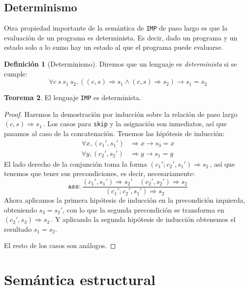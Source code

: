 \documentclass[
  a4paper, 
  10pt, 
  parskip=half, 
  toc=bibliography,
]{scrbook}
\theoremstyle{definition}
\theoremstyle{bolddef}
\newtheorem{theorem}{Teorema}[section]
\newtheorem{definition}[theorem]{Definición}
\newcommand{\funfont}[1]{\texttt{#1}}
\renewcommand{\implies}{\rightarrow}
\newcommand{\ImpConcat}[2]{{#1} \texttt{;} \ {#2}}
\newcommand{\ImpSkip}{\texttt{skip}}
\newcommand{\ImpName}{\texttt{IMP}}
\newcommand{\bigstep}{\Longrightarrow}
\begin{document}
\subsection{Determinismo}

Otra propiedad importante de la semántica de \ImpName{} de paso largo
es que la evaluación de un programa es determinista. Es decir, dado un
programa y un estado solo a lo sumo hay un estado al que el programa puede evaluarse.

\begin{definition}[Determinismo]\label{thm:deterministic}
  Diremos que un lenguaje es \emph{determinista} si se cumple:
  \[
  \forall c \ s \ s_1 \ s_2, ((c, s) \bigstep s_1 \land (c, s) \bigstep s_2) \implies s_1 = s_2
  \]
\end{definition}

\begin{theorem}
  El lenguaje \ImpName{} es determinista.
\end{theorem}

\begin{proof}
  Haremos la demostración por inducción sobre la relación de paso largo
  \((c, s) \bigstep s_1\, \). Los casos para \ImpSkip{} y la asignación son
  inmediatos, así que pasamos al caso de la concatenación. Tenemos 
  las hipótesis de inducción:
  \begin{align*}
    \forall x, (c_1', s_1') &\bigstep x \implies s_3 = x \\
    \forall y, (c_2', s_2') &\bigstep y \implies s_1 = y
  \end{align*}
  El lado derecho de la conjunción toma la forma
  \((\ImpConcat{c_1'}{c_2'}, s_1') \bigstep s_2\, \), así que tenemos que tener
  sus precondiciones, es decir, necesariamente:
  \[\funfont{ass}: \frac{
      (c_1', s_1') \bigstep s_2' 
      \quad 
      (c_2', s_2') \bigstep s_2
    }{
      (\ImpConcat{c_1'}{c_2'}, s_1') \bigstep s_2
    }
  \]
  Ahora aplicamos la primera hipótesis de inducción en la precondición
  izquierda, obteniendo \(s_3 = s_2'\), con lo que la segunda precondición
  se transforma en \((c_2', s_3) \bigstep s_2\, \). Y aplicando la
  segunda hipótesis de inducción obtenemos el resultado \(s_1 = s_2\).

  El resto de los casos son análogos.
\end{proof}

\section{Semántica estructural}
\end{document}
